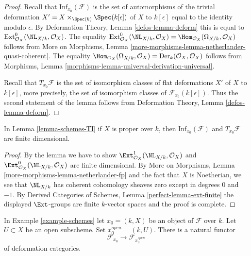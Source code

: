 \begin{proof}
Recall that $\text{Inf}_{x_0}(\mathcal{F})$ is the set of
automorphisms of the trivial deformation
$X' = X \times_{\Spec(k)} \Spec(k[\epsilon])$ of $X$ to $k[\epsilon]$
equal to the identity modulo $\epsilon$.
By Deformation Theory, Lemma \ref{defos-lemma-deform}
this is equal to $\text{Ext}^0_{\mathcal{O}_X}(\NL_{X/k}, \mathcal{O}_X)$.
The equality $\text{Ext}^0_{\mathcal{O}_X}(\NL_{X/k}, \mathcal{O}_X) =
\Hom_{\mathcal{O}_X}(\Omega_{X/k}, \mathcal{O}_X)$ follows from
More on Morphisms, Lemma
\ref{more-morphisms-lemma-netherlander-quasi-coherent}.
The equality
$\Hom_{\mathcal{O}_X}(\Omega_{X/k}, \mathcal{O}_X) =
\text{Der}_k(\mathcal{O}_X, \mathcal{O}_X)$
follows from Morphisms, Lemma
\ref{morphisms-lemma-universal-derivation-universal}.

\medskip\noindent
Recall that $T_{x_0}\mathcal{F}$ is the set of isomorphism classes
of flat deformations $X'$ of $X$ to $k[\epsilon]$, more precisely,
the set of isomorphism classes of $\mathcal{F}_{x_0}(k[\epsilon])$.
Thus the second statement of the lemma follows from
Deformation Theory, Lemma \ref{defos-lemma-deform}.
\end{proof}

\begin{lemma}
\label{lemma-proper-schemes-TI}
In Lemma \ref{lemma-schemes-TI} if $X$ is proper over $k$, then
$\text{Inf}_{x_0}(\mathcal{F})$ and $T_{x_0}\mathcal{F}$ are
finite dimensional.
\end{lemma}

\begin{proof}
By the lemma we have to show
$\Ext^1_{\mathcal{O}_X}(\NL_{X/k}, \mathcal{O}_X)$ and
$\Ext^0_{\mathcal{O}_X}(\NL_{X/k}, \mathcal{O}_X)$ are finite
dimensional. By More on Morphisms, Lemma
\ref{more-morphisms-lemma-netherlander-fp}
and the fact that $X$ is Noetherian, we see that
$\NL_{X/k}$ has coherent cohomology sheaves zero except
in degrees $0$ and $-1$.
By Derived Categories of Schemes, Lemma \ref{perfect-lemma-ext-finite}
the displayed $\Ext$-groups are finite $k$-vector spaces
and the proof is complete.
\end{proof}

\begin{lemma}
\label{lemma-open}
In Example \ref{example-schemes} let $x_0 = (k, X)$ be an object
of $\mathcal{F}$ over $k$. Let $U \subset X$ be an open subscheme.
Set $x_0^{open} = (k, U)$. There is a natural functor
$$
\mathcal{F}_{x_0} \longrightarrow \mathcal{F}_{x_0^{open}}
$$
of deformation categories.
\end{lemma}

